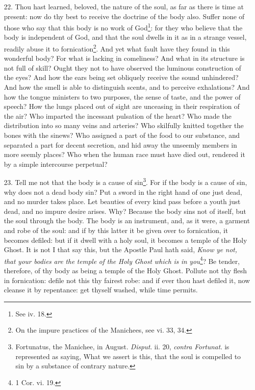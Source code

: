 22. Thou hast learned, beloved, the nature of the soul, as far as there is time at present: now do thy best to receive the doctrine of the body also. Suffer none of those who say that this body is no work of God\footnote{See iv. 18.}: for they who believe that the body is independent of God, and that the soul dwells in it as in a strange vessel, readily abuse it to fornication\footnote{On the impure practices of the Manichees, see vi. 33, 34.}. And yet what fault have they found in this wonderful body? For what is lacking in comeliness? And what in its structure is not full of skill? Ought they not to have observed the luminous construction of the eyes? And how the ears being set obliquely receive the sound unhindered? And how the smell is able to distinguish scents, and to perceive exhalations? And how the tongue ministers to two purposes, the sense of taste, and the power of speech? How the lungs placed out of sight are unceasing in their respiration of the air? Who imparted the incessant pulsation of the heart? Who made the distribution into so many veins and arteries? Who skilfully knitted together the bones with the sinews? Who assigned a part of the food to our substance, and separated a part for decent secretion, and hid away the unseemly members in more seemly places? Who when the human race must have died out, rendered it by a simple intercourse perpetual?

23. Tell me not that the body is a cause of sin\footnote{Fortunatus, the Manichee, in August. \emph{Disput}. ii. 20, \emph{contra Fortunat}. is represented as saying, What we assert is this, that the soul is compelled to sin by a substance of contrary nature.}. For if the body is a cause of sin, why does not a dead body sin? Put a sword in the right hand of one just dead, and no murder takes place. Let beauties of every kind pass before a youth just dead, and no impure desire arises. Why? Because the body sins not of itself, but the soul through the body. The body is an instrument, and, as it were, a garment and robe of the soul: and if by this latter it be given over to fornication, it becomes defiled: but if it dwell with a holy soul, it becomes a temple of the Holy Ghost. It is not I that say this, but the Apostle Paul hath said, \emph{Know ye not, that your bodies are the temple of the Holy Ghost which is in you}\footnote{1 Cor. vi. 19.}? Be tender, therefore, of thy body as being a temple of the Holy Ghost. Pollute not thy flesh in fornication: defile not this thy fairest robe: and if ever thou hast defiled it, now cleanse it by repentance: get thyself washed, while time permits.

